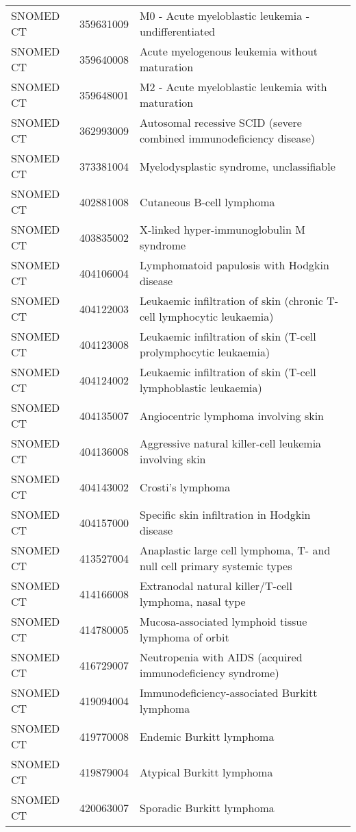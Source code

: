 \begin{longtable}{p{}p{}p{}}
  SNOMED CT & 359631009 & M0 - Acute myeloblastic leukemia - undifferentiated \\ 
  SNOMED CT & 359640008 & Acute myelogenous leukemia without maturation \\ 
  SNOMED CT & 359648001 & M2 - Acute myeloblastic leukemia with maturation \\ 
  SNOMED CT & 362993009 & Autosomal recessive SCID (severe combined immunodeficiency disease) \\ 
  SNOMED CT & 373381004 & Myelodysplastic syndrome, unclassifiable \\ 
  SNOMED CT & 402881008 & Cutaneous B-cell lymphoma \\ 
  SNOMED CT & 403835002 & X-linked hyper-immunoglobulin M syndrome \\ 
  SNOMED CT & 404106004 & Lymphomatoid papulosis with Hodgkin disease \\ 
  SNOMED CT & 404122003 & Leukaemic infiltration of skin (chronic T-cell lymphocytic leukaemia) \\ 
  SNOMED CT & 404123008 & Leukaemic infiltration of skin (T-cell prolymphocytic leukaemia) \\ 
  SNOMED CT & 404124002 & Leukaemic infiltration of skin (T-cell lymphoblastic leukaemia) \\ 
  SNOMED CT & 404135007 & Angiocentric lymphoma involving skin \\ 
  SNOMED CT & 404136008 & Aggressive natural killer-cell leukemia involving skin \\ 
  SNOMED CT & 404143002 & Crosti's lymphoma \\ 
  SNOMED CT & 404157000 & Specific skin infiltration in Hodgkin disease \\ 
  SNOMED CT & 413527004 & Anaplastic large cell lymphoma, T- and null cell primary systemic types \\ 
  SNOMED CT & 414166008 & Extranodal natural killer/T-cell lymphoma, nasal type \\ 
  SNOMED CT & 414780005 & Mucosa-associated lymphoid tissue lymphoma of orbit \\ 
  SNOMED CT & 416729007 & Neutropenia with AIDS (acquired immunodeficiency syndrome) \\ 
  SNOMED CT & 419094004 & Immunodeficiency-associated Burkitt lymphoma \\ 
  SNOMED CT & 419770008 & Endemic Burkitt lymphoma \\ 
  SNOMED CT & 419879004 & Atypical Burkitt lymphoma \\ 
  SNOMED CT & 420063007 & Sporadic Burkitt lymphoma \\ 

\end{longtable}
